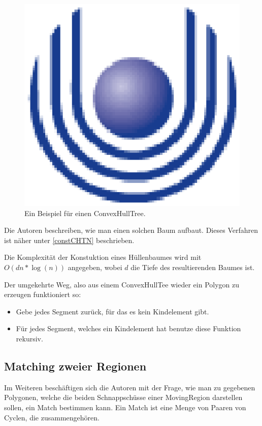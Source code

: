 \begin{figure}
	\centering
	\includegraphics{feu_logo2.eps}
	\caption{Ein Beispiel für einen ConvexHullTree.}
	\label{fig:ConHullTree}
\end{figure}

Die Autoren beschreiben, wie man einen solchen Baum aufbaut. Dieses Verfahren ist näher unter \ref{constCHTN} beschrieben.

Die Komplexität der Konstuktion eines Hüllenbaumes wird mit $O(dn*\log(n))$ angegeben, wobei $d$ die Tiefe des resultierenden Baumes ist.

Der umgekehrte Weg, also aus einem ConvexHullTee wieder ein Polygon zu erzeugen funktioniert so:

\begin{itemize}
\item Gebe jedes Segment zurück, für das es kein Kindelement gibt.
\item Für jedes Segment, welches ein Kindelement hat benutze diese Funktion rekursiv.
\end{itemize}

\subsection{Matching zweier Regionen}

Im Weiteren beschäftigen sich die Autoren mit der Frage, wie man zu gegebenen Polygonen, welche die beiden Schnappschüsse einer MovingRegion darstellen sollen, ein Match bestimmen kann. Ein Match ist eine Menge von Paaren von Cyclen, die zusammengehören.

